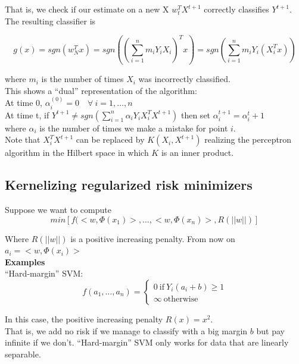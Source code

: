 \documentclass[11pt, english]{article}
\begin{document}
That is, we check if our estimate on a new X $w^T_t X^{t+1}$ correctly classifies $Y^{t+1}$. The resulting classifier is

\begin{equation}
g(x) = sgn(w_N^T x) = sgn((\sum_{i=1}^{n} m_i Y_i X_i)^T x) = sgn(\sum_{i=1}^{n}m_i Y_i(X_i^Tx))
\end{equation}

where $m_i$ is the number of times $X_i$ was incorrectly classified.\\

This shows a ``dual'' representation of the algorithm:\\

At time 0, $\alpha_i^{(0)} = 0 \quad \forall \ i = 1, \dots, n$\\
At time t, if $Y^{t+1} \neq sgn(\sum_{i=1}^{n} \alpha_i Y_i X_i^TX^{t+1}) $ then set $\alpha_i^{t+1} = \alpha_i^t + 1$\\

where $\alpha_i$ is the number of times we make a mistake for point $i$.\\ 

Note that $X_i^TX^{t+1}$ can be replaced by $K(X_i, X^{t+1})$ realizing the perceptron algorithm in the Hilbert space in which $K$ is an inner product.


\subsection{Kernelizing regularized risk minimizers}

Suppose we want to compute
\begin{equation}
	min[f(<w,\Phi(x_1)>, \dots, <w, \Phi (x_n)>, R(||w||)]
\end{equation}

Where $ R(||w||)$ is a positive increasing penalty. From now on $a_i = <w,\Phi(x_i)>$\\

\textbf{Examples} \\
``Hard-margin'' SVM:
$$f(a_1, \dots, a_n) = \begin{cases}
0\ \text{if}\ Y_i(a_i + b)\geq 1\\
\infty \ \text{otherwise}
\end{cases}$$

In this case, the positive increasing penalty $R(x) = x^2$.\\

That is, we add no risk if we manage to classify with a big margin $b$ but pay infinite if we don't. ``Hard-margin'' SVM only works for data that are linearly separable.\\
\end{document}
